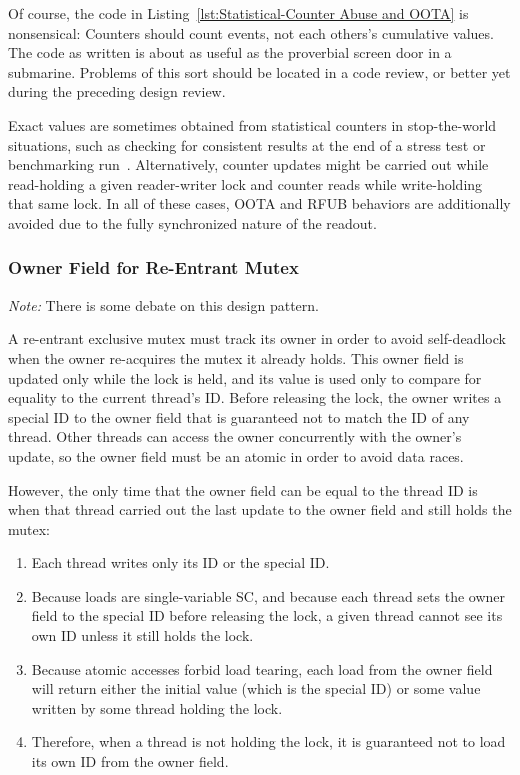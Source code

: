 \documentclass[10]{article}
\begin{document}
Of course, the code in
Listing~\ref{lst:Statistical-Counter Abuse and OOTA}
is nonsensical: Counters should count events, not each others's cumulative
values.
The code as written is about as useful as the proverbial screen door in
a submarine.
Problems of this sort should be located in a code review, or better yet
during the preceding design review.

Exact values are sometimes obtained from statistical counters in
stop-the-world situations, such as checking for consistent results
at the end of a stress test or benchmarking
run~\cite[Sections 5.3 and 5.4]{McKenney2018ParallelProgramming-2018-12-08a}.
Alternatively, counter updates might be carried out while read-holding
a given reader-writer lock and counter reads while write-holding
that same lock.
In all of these cases, OOTA and RFUB behaviors are additionally avoided due
to the fully synchronized nature of the readout.

\subsubsection{Owner Field for Re-Entrant Mutex}
\label{sec:Owner Field for Re-Entrant Mutex}

\emph{Note:} There is some debate on this design pattern.

A re-entrant exclusive mutex must track its owner in order to avoid
self-deadlock when the owner re-acquires the mutex it already holds.
This owner field is updated only while the lock is held, and its value
is used only to compare for equality to the current thread's ID.
Before releasing the lock, the owner writes a special ID to the owner
field that is guaranteed not to match the ID of any thread.
Other threads can access the owner concurrently with the owner's
update, so the owner field must be an atomic in order to avoid data races.

However, the only time that the owner field can be equal to the thread ID
is when that thread carried out the last update to the owner field and
still holds the mutex:

\begin{enumerate}
\item	Each thread writes only its ID or the special ID.
\item	Because  loads are single-variable
	SC, and because each thread sets the owner field to the special
	ID before releasing the lock, a given thread cannot see its own
	ID unless it still holds the lock.
\item	Because atomic accesses forbid load tearing, each load from
	the owner field will return either the initial value
	(which is the special ID) or some value written by some
	thread holding the lock.
\item	Therefore, when a thread is not holding the lock, it is guaranteed
	not to load its own ID from the owner field.
\end{enumerate}
\end{document}
